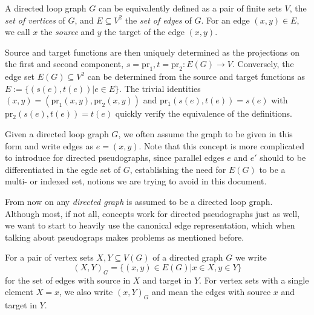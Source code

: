 \begin{remark}
A directed loop graph $G$ can be equivalently defined as a pair of finite sets $V$, the \textit{set of vertices} of $G$, and $E \subseteq V^2$ the \textit{set of edges} of $G$. For an edge $(x,y) \in E$, we call $x$ the \textit{source} and $y$ the target of the edge $(x,y)$.

Source and target functions are then uniquely determined as the projections on the first and second component, $s = \mathrm{pr}_1, t = \mathrm{pr}_2: E(G) \to V.$ Conversely, the edge set $E(G) \subseteq V^2$ can be determined from the source and target functions as $E:=\{(s(e),t(e)) | e \in E\}$. The trivial identities $(x,y) = (\mathrm{pr}_1(x,y),\mathrm{pr}_2(x,y))$ and $\mathrm{pr_1}(s(e), t(e)) = s(e)$ with  $\mathrm{pr_2}(s(e), t(e)) = t(e)$ quickly verify the equivalence of the definitions.

Given a directed loop graph $G$, we often assume the graph to be given in this form and write edges as $e=(x,y)$. Note that this concept is more complicated to introduce for directed pseudographs, since parallel edges $e$ and $e'$ should to be differentiated in the egde set of $G$, establishing the need for $E(G)$ to be a multi- or indexed set, notions we are trying to avoid in this document.
\end{remark}

From now on any \textit{directed graph} is assumed to be a directed loop graph. Although most, if not all, concepts work for directed pseudographs just as well, we want to start to heavily use the canonical edge representation, which when talking about pseudograps makes problems as mentioned before.

\begin{remark} 
 For a pair of vertex sets $X,Y \subseteq V(G)$ of a directed graph $G$ we write
\[
(X,Y)_G = \{(x,y) \in E(G) | x \in X, y \in Y \}
\] 
for the set of edges with source in $X$ and target in $Y$. For vertex sets with a single element $X = {x}$, we also write $(x,Y)_G$ and mean the edges with source $x$ and target in $Y$.
\end{remark}


